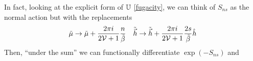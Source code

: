 In fact, looking at the explicit form of $\mathbb{U}$ \eqref{fugacity}, we can think of $S_{ns}$ as the normal action but with the replacements
\begin{align}
	\tilde{\mu}&\rightarrow \tilde{\mu} + \frac{2\pi i}{2\mathcal{V}+1} \frac{n}{\tilde{\beta}}
	&
	\tilde{\vec{h}} \rightarrow \tilde{\vec{h}} + \frac{2\pi i}{2\mathcal{V}+1} \frac{2s}{\tilde{\beta}} \hat{h}
\end{align}
Then, ``under the sum'' we can functionally differentiate $\exp(-S_{ns})$ and 
